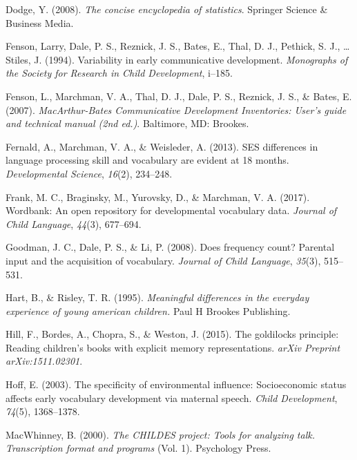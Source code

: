 \documentclass[10pt, letterpaper]{article}
\newenvironment{CSLReferences}%
  {}%
  {\par}
\begin{document}
\begin{CSLReferences}{1}{0}
\leavevmode{}%
Dodge, Y. (2008). \emph{The concise encyclopedia of statistics}.
Springer Science \& Business Media.

\leavevmode{}%
Fenson, Larry, Dale, P. S., Reznick, J. S., Bates, E., Thal, D. J.,
Pethick, S. J., \ldots{} Stiles, J. (1994). Variability in early
communicative development. \emph{Monographs of the Society for Research
in Child Development}, i--185.

\leavevmode{}%
Fenson, L., Marchman, V. A., Thal, D. J., Dale, P. S., Reznick, J. S.,
\& Bates, E. (2007). \emph{{M}ac{A}rthur-{B}ates {C}ommunicative
{D}evelopment {I}nventories: User's guide and technical manual (2nd
ed.)}. Baltimore, MD: Brookes.

\leavevmode{}%
Fernald, A., Marchman, V. A., \& Weisleder, A. (2013). SES differences
in language processing skill and vocabulary are evident at 18 months.
\emph{Developmental Science}, \emph{16}(2), 234--248.

\leavevmode{}%
Frank, M. C., Braginsky, M., Yurovsky, D., \& Marchman, V. A. (2017).
Wordbank: An open repository for developmental vocabulary data.
\emph{Journal of Child Language}, \emph{44}(3), 677--694.

\leavevmode{}%
Goodman, J. C., Dale, P. S., \& Li, P. (2008). Does frequency count?
Parental input and the acquisition of vocabulary. \emph{Journal of Child
Language}, \emph{35}(3), 515--531.

\leavevmode{}%
Hart, B., \& Risley, T. R. (1995). \emph{Meaningful differences in the
everyday experience of young american children.} Paul H Brookes
Publishing.

\leavevmode{}%
Hill, F., Bordes, A., Chopra, S., \& Weston, J. (2015). The goldilocks
principle: Reading children's books with explicit memory
representations. \emph{arXiv Preprint arXiv:1511.02301}.

\leavevmode{}%
Hoff, E. (2003). The specificity of environmental influence:
Socioeconomic status affects early vocabulary development via maternal
speech. \emph{Child Development}, \emph{74}(5), 1368--1378.

\leavevmode{}%
MacWhinney, B. (2000). \emph{The CHILDES project: Tools for analyzing
talk. Transcription format and programs} (Vol. 1). Psychology Press.


\end{CSLReferences}
\end{document}
